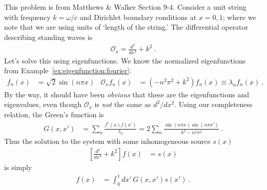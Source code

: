 \begin{example}
This problem is from Matthews \& Walker Section 9-4. Consider a unit string with frequency $k= \omega/c$ and Dirichlet boundary conditions at $x=0,1$; where we note that we are using units of `length of the string.' The differential operator describing standing waves is
\begin{align}
 	\mathcal O_x = \frac{d^2}{dx^2} + k^2 \ .
 \end{align}
Let's solve this using eigenfunctions. We know the normalized eigenfunctions from Example~\ref{ex:eigenfunction:fourier}:
\begin{align}
	f_n(x) &= \sqrt{2} \sin (n\pi x) 
	&
	\mathcal O_x f_n(x) 
	& = \left(-n^2\pi^2 + k^2\right)f_n(x) \equiv \lambda_n f_n(x) \ .
\end{align}
By the way, it should  have been \emph{obvious} that these are the eigenfunctions and eigenvalues, even though $\mathcal O_x$ is \emph{not} the same as $d^2/dx^2$. Using our completeness relation, the Green's function is
\begin{align}
	G(x,x') &= \sum_n \frac{f^*(x)f(x')}{\lambda_n}
	=
	2\sum_n\frac{\sin(n\pi x) \sin (n\pi x')}{k^2 - n^2\pi^2} \ .
\end{align}
Thus the solution to the system with some inhomogeneous source $s(x)$
\begin{align}
	\left[\frac{d^2}{dx^2} + k^2\right] f(x) &= s(x)
\end{align}
is simply
\begin{align}
	f(x) &= \int_0^1 dx' \, G(x,x') s(x') \ .
\end{align}
\end{example}

